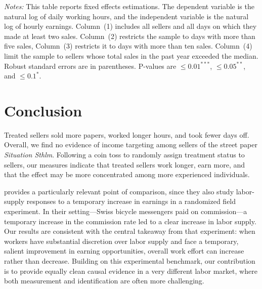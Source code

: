 \documentclass[12pt]{article}
\begin{document}
\begin{table} [H]
\centering
\begin{threeparttable} 
\caption{\label{tab:observational} Observational findings}
\small{}
\begin{tablenotes}
\textit{Notes:} This table reports fixed effects estimations. The dependent variable is the natural log of daily working hours, and the independent variable is the natural log of hourly earnings. Column~(1) includes all sellers and all days on which they made at least two sales. Column~(2) restricts the sample to days with more than five sales, Column~(3) restricts it to days with more than ten sales. Column~(4) limit the sample to sellers whose total sales in the past year exceeded the median. Robust standard errors are in parentheses. P-values are $\leq 0.01^{***}$,  $\leq 0.05^{**}$, and $\leq 0.1^{*}$. 
\end{tablenotes}
\end{threeparttable}
\end{table}


\section{Conclusion}
Treated sellers sold more papers, worked longer hours, and took fewer days off. Overall, we find no evidence of income targeting among sellers of the street paper \textit{Situation Sthlm}. Following a coin toss to randomly assign treatment status to sellers, our measures indicate that treated sellers work longer, earn more, and that the effect may be more concentrated among more experienced individuals.

\cite{fehrgoette} provides a particularly relevant point of comparison, since they also study labor-supply responses to a temporary increase in earnings in a randomized field experiment. In their setting—Swiss bicycle messengers paid on commission—a temporary increase in the commission rate led to a clear increase in labor supply. 
Our results are consistent with the central takeaway from that experiment: when workers have substantial discretion over labor supply and face a temporary, salient improvement in earning opportunities, overall work effort can increase rather than decrease. Building on this experimental benchmark, our contribution is to provide equally clean causal evidence in a very different labor market, where both measurement and identification are often more challenging.
\end{document}
